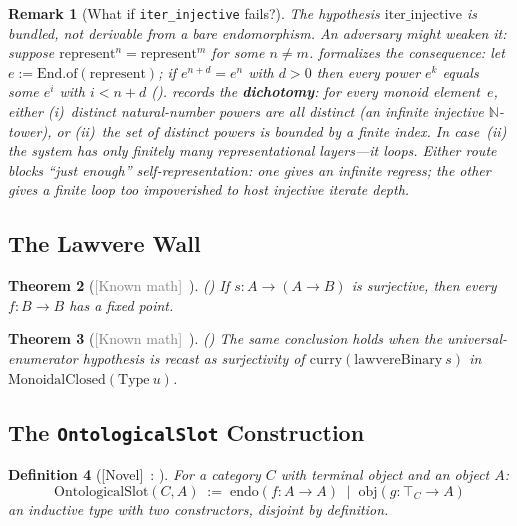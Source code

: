 \documentclass[11pt]{article}
\newtheorem{theorem}{Theorem}[section]
\newtheorem{definition}[theorem]{Definition}
\newtheorem{remark}[theorem]{Remark}
\newcommand{\novel}{\textcolor{blue!70!black}{[Novel]}}
\newcommand{\known}{\textcolor{gray}{[Known math]}}
\begin{document}
\begin{remark}[What if \texttt{iter\_injective} fails?]
\label{rem:dichotomy}
The hypothesis $\mathrm{iter\_injective}$ is \emph{bundled}, not derivable from
a bare endomorphism. An adversary might weaken it: suppose
$\mathrm{represent}^n = \mathrm{represent}^m$ for some $n \neq m$.
 formalizes the consequence: let
$e := \mathrm{End.of}(\mathrm{represent})$; if $e^{n+d}=e^n$ with $d>0$ then
every power $e^k$ equals some $e^i$ with $i < n+d$
().
records the \textbf{dichotomy}: for every monoid element~$e$, either
(i)~distinct natural-number powers are all distinct (an infinite injective
$\mathbb{N}$-tower), or (ii)~the set of \emph{distinct} powers is bounded by a
finite index.  In case~(ii) the system has only finitely many representational
layers---it loops.  Either route blocks ``just enough'' self-representation: one
gives an infinite regress; the other gives a finite loop too impoverished to
host injective iterate depth.
\end{remark}

\subsection{The Lawvere Wall}
\label{sec:lawvere}

\begin{theorem}[\known\ ]
\label{thm:lawvere}
() If $s : A \to (A \to B)$ is surjective, then every $f : B \to B$ has a fixed point.
\end{theorem}

\begin{theorem}[\known\ ]
\label{thm:lawvere-ccc}
() The same conclusion holds when the universal-enumerator hypothesis is recast as surjectivity of $\mathrm{curry}(\mathrm{lawvereBinary}\ s)$ in $\mathrm{MonoidalClosed}(\mathrm{Type}\ u)$.
\end{theorem}

\subsection{The \texttt{OntologicalSlot} Construction}
\label{sec:ontoslot}

\begin{definition}[\novel\ : ]
\label{def:ontoslot}
For a category $C$ with terminal object and an object $A$:
\[
\mathrm{OntologicalSlot}(C, A) \;:=\;
  \mathrm{endo}(f : A \to A) \;\mid\; \mathrm{obj}(g : \top_C \to A)
\]
an inductive type with two constructors, disjoint by definition.
\end{definition}
\end{document}
